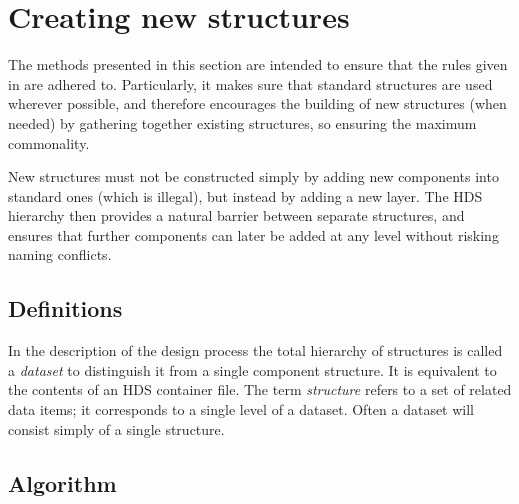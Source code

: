 \section{Creating new structures\label{se:newdesign}}

The methods presented in this section are intended to ensure that the
rules given in 
are adhered to. Particularly, it
makes sure that standard structures are used wherever possible, and
therefore encourages the building of new structures (when needed) by
gathering together existing structures, so ensuring the maximum
commonality.

New structures must not be constructed simply by adding new
components into standard ones (which is illegal), but instead by
adding a new layer. The
HDS hierarchy then provides a natural barrier between separate
structures, and ensures that further components can later be added at
any level without risking naming conflicts.  

\subsection{Definitions\label{se:newdef}}

In the description
of the design process the total hierarchy of structures is called a
{\it dataset} to distinguish it from a single component structure. 
It is equivalent to the contents of an HDS container file.
The term {\it structure} refers to a set of related data items; it
corresponds to a single level of a dataset.
Often a dataset will consist simply of a single structure.

\subsection{Algorithm\label{se:newalg}}

